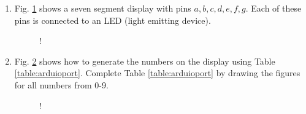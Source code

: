 \renewcommand{\theequation}{\theenumi}
\renewcommand{\thefigure}{\theenumi}
\begin{enumerate}[label=\thesection.\arabic*.,ref=\thesection.\theenumi]

\item  Fig. \ref{fig:sevenseg} shows a seven segment display with pins $a,b,c,d,e,f,g$.  Each of these pins is connected to an LED (light emitting device).

\begin{figure}[!ht]
\centering
\resizebox {\columnwidth} {!} {

}
\caption{}
\label{fig:sevenseg}
\end{figure}

\item Fig. \ref{fig:sevenseg12} shows how to generate the numbers on the display using Table
\ref{table:arduioport}.  Complete Table \ref{table:arduioport} by drawing the figures for all numbers from 0-9.

\begin{figure}[!h]
\begin{center}
\resizebox {\columnwidth} {!} {

}
\end{center}
\caption{}
\label{fig:sevenseg12}
\end{figure}


\begin{table}[!h]
\centering

\caption{}
\label{table:arduioport}
\end{table}


\end{enumerate}
